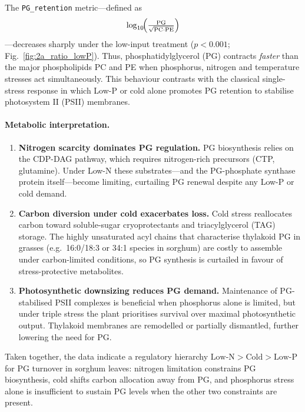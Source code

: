 \documentclass[10pt,letterpaper]{article}
\begin{document}
The \texttt{PG\_retention} metric---defined as%
\[
  \log_{10}\!\Bigl(\tfrac{\text{PG}}{\sqrt{\text{PC}\cdot\text{PE}}}\Bigr)
\]
---decreases sharply under the low-input treatment
($p<0.001$;
Fig.~\ref{fig:2a_ratio_lowP}).
Thus, phosphatidylglycerol (PG) contracts \emph{faster} than the major
phospholipids PC and PE when phosphorus, nitrogen and temperature
stresses act simultaneously.
This behaviour contrasts with the classical single-stress response in
which Low-P or cold alone promotes PG retention to stabilise photosystem II
(PSII) membranes.

\paragraph{Metabolic interpretation.}
\begin{enumerate}
  \item \textbf{Nitrogen scarcity dominates PG regulation.}  
        PG biosynthesis relies on the CDP-DAG pathway, which requires
        nitrogen-rich precursors (CTP, glutamine).  Under Low-N these
        substrates---and the PG-phosphate synthase protein itself---become
        limiting, curtailing PG renewal despite any Low-P or cold demand.
  \item \textbf{Carbon diversion under cold exacerbates loss.}  
      Cold stress reallocates carbon toward soluble-sugar cryoprotectants
      and triacylglycerol (TAG) storage.  The highly unsaturated
      acyl chains that characterise thylakoid PG in grasses
      (e.g.\ 16:0/18:3 or 34:1 species in sorghum) are costly to
      assemble under carbon-limited conditions, so PG synthesis is
      curtailed in favour of stress-protective metabolites.
  \item \textbf{Photosynthetic downsizing reduces PG demand.}  
        Maintenance of PG-stabilised PSII complexes is beneficial when
        phosphorus alone is limited, but under triple stress the plant
        prioritises survival over maximal photosynthetic output.
        Thylakoid membranes are remodelled or partially dismantled,
        further lowering the need for PG.
\end{enumerate}

Taken together, the data indicate a regulatory hierarchy \(\text{Low-N} > \text{Cold} > \text{Low-P}\) for PG turnover in sorghum leaves:
nitrogen limitation constrains PG biosynthesis,
cold shifts carbon allocation away from PG, and
phosphorus stress alone is insufficient to sustain PG levels when the
other two constraints are present.
\end{document}
